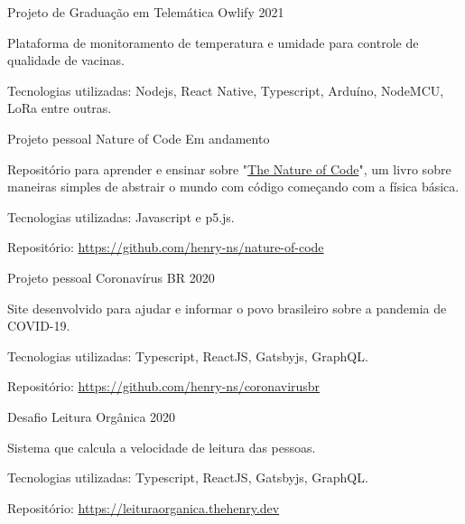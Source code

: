 
\begin{cventries}
  \cventry
    {Projeto de Graduação em Telemática} %
    {Owlify} %
    {} %
    {2021} %
    {
      \begin{cvitems} %
        \item {Plataforma de monitoramento de temperatura e umidade para controle de qualidade de vacinas.}
        \item {Tecnologias utilizadas: Nodejs, React Native, Typescript, Arduíno, NodeMCU, LoRa entre outras.}
      \end{cvitems}
    }
      
  \cventry
    {Projeto pessoal} %
    {Nature of Code} %
    {} %
    {Em andamento} %
    {
      \begin{cvitems} %
        \item {Repositório para aprender e ensinar sobre "\href{https://natureofcode.com/}{The Nature of Code}", um livro sobre maneiras simples de abstrair o mundo com código começando com a física básica.}
        \item {Tecnologias utilizadas: Javascript e p5.js.}
        \item {Repositório: \url{https://github.com/henry-ns/nature-of-code}}
      \end{cvitems}
    }

  \cventry
    {Projeto pessoal} %
    {Coronavírus BR} %
    {} %
    {2020} %
    { 
      \begin{cvitems} %
        \item {Site desenvolvido para ajudar e informar o povo brasileiro sobre a pandemia de COVID-19.}
        \item {Tecnologias utilizadas: Typescript, ReactJS, Gatsbyjs, GraphQL.}
        \item {Repositório: \url{https://github.com/henry-ns/coronavirusbr}}
      \end{cvitems}
    }
  
  \cventry
    {Desafio} %
    {Leitura Orgânica} %
    {} %
    {2020} %
    {
      \begin{cvitems} %
        \item {Sistema que calcula a velocidade de leitura das pessoas.}
        \item {Tecnologias utilizadas: Typescript, ReactJS, Gatsbyjs, GraphQL.}
        \item {Repositório: \url{https://leituraorganica.thehenry.dev}}
      \end{cvitems}
    }
  

\end{cventries}
